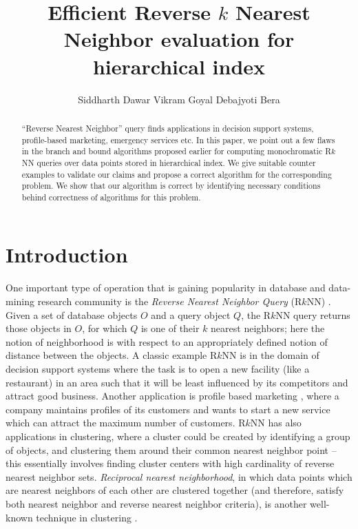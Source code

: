 \documentclass[prodmode,letterpaper]{acmsmall}
\newcommand{\rknn}{R$k$NN\xspace}
\begin{document}

\title{Efficient Reverse $k$ Nearest Neighbor evaluation for hierarchical index}
\author{Siddharth Dawar
Vikram Goyal
Debajyoti Bera
}

\begin{abstract}
``Reverse Nearest Neighbor'' query finds applications in decision support
systems, profile-based marketing, emergency services etc.  In this paper,
we point out a few flaws in the branch and bound algorithms proposed
earlier for computing monochromatic \rknn queries over data points stored
in hierarchical index. We give suitable counter examples to validate our claims and propose a
correct algorithm for the corresponding problem.
We show that our algorithm is correct by identifying necessary
conditions behind correctness of algorithms for this problem.
\end{abstract}






\maketitle


\section{Introduction}\label{section:intro}
One important type of operation that is gaining popularity in database and
data-mining research
community is the {\em Reverse Nearest Neighbor Query} (\rknn)
\cite{korn2000influence}. Given a set of database objects $O$ and a query
object $Q$, the \rknn query returns those objects in $O$, for which $Q$
is one of their $k$ nearest neighbors; here the notion of neighborhood is with
respect to an appropriately defined notion of distance between the objects.
A classic example \rknn is in the domain of decision support systems where the task is to open
a new facility (like a restaurant) in an area such that it will be least influenced
by its competitors and attract good business. Another application is profile
based marketing \cite{korn2000influence}, where a company maintains profiles of
its customers and wants to start a new service which can attract the maximum
number of customers.
\rknn has also applications in clustering, where a cluster could be created by
identifying a group of objects, and clustering them around their common nearest
neighbor point -- this essentially involves finding cluster centers
with high cardinality of reverse nearest neighbor sets.
{\em Reciprocal nearest neighborhood}, in which data
points which are nearest neighbors of each other are clustered
together (and therefore, satisfy both nearest neighbor and reverse nearest
neighbor criteria), is another well-known technique in clustering \cite{lopez2012fastrnn}.
\end{document}
